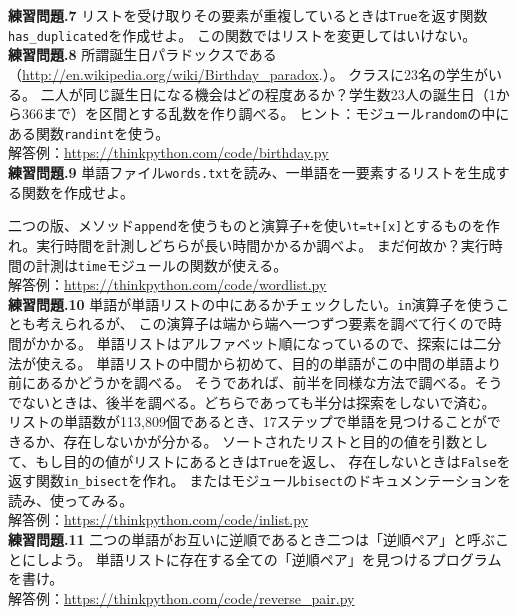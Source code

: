 \documentclass[a4j,12pt,makeidx]{jbook}
\newcommand{\tp}{\thechapter}
\begin{document}
\noindent
{\bf 練習問題\tp.7} リストを受け取りその要素が重複しているときは{\tt True}を返す関数{\tt has\_duplicated}を作成せよ。
この関数ではリストを変更してはいけない。\\

\noindent
{\bf 練習問題\tp.8} 所謂誕生日パラドックスである（\url{http://en.wikipedia.org/wiki/Birthday_paradox}.）。
クラスに23名の学生がいる。
二人が同じ誕生日になる機会はどの程度あるか？学生数23人の誕生日（1から366まで）を区間とする乱数を作り調べる。
ヒント：モジュール{\tt random}の中にある関数{\tt randint}を使う。\\
解答例：\url{https://thinkpython.com/code/birthday.py} \\

\noindent
{\bf 練習問題\tp.9} 単語ファイル{\tt words.txt}を読み、一単語を一要素するリストを生成する関数を作成せよ。\par
二つの版、メソッド{\tt append}を使うものと演算子{\tt +}を使い{\tt t=t+[x]}とするものを作れ。実行時間を計測しどちらが長い時間かかるか調べよ。
まだ何故か？実行時間の計測は{\tt time}モジュールの関数が使える。\\
解答例：\url{https://thinkpython.com/code/wordlist.py} \\

\noindent
{\bf 練習問題\tp.10} 単語が単語リストの中にあるかチェックしたい。{\tt in}演算子を使うことも考えられるが、
この演算子は端から端へ一つずつ要素を調べて行くので時間がかかる。
単語リストはアルファベット順になっているので、探索には二分法が使える。
単語リストの中間から初めて、目的の単語がこの中間の単語より前にあるかどうかを調べる。
そうであれば、前半を同様な方法で調べる。そうでないときは、後半を調べる。どちらであっても半分は探索をしないで済む。
リストの単語数が113,809個であるとき、17ステップで単語を見つけることができるか、存在しないかが分かる。
ソートされたリストと目的の値を引数として、もし目的の値がリストにあるときは{\tt True}を返し、
存在しないときは{\tt False}を返す関数{\tt in\_bisect}を作れ。
またはモジュール{\tt bisect}のドキュメンテーションを読み、使ってみる。\\
解答例：\url{https://thinkpython.com/code/inlist.py} \\

\noindent
{\bf 練習問題\tp.11} 二つの単語がお互いに逆順であるとき二つは「逆順ペア」と呼ぶことにしよう。
単語リストに存在する全ての「逆順ペア」を見つけるプログラムを書け。\\
解答例：\url{https://thinkpython.com/code/reverse_pair.py} \\
\end{document}
